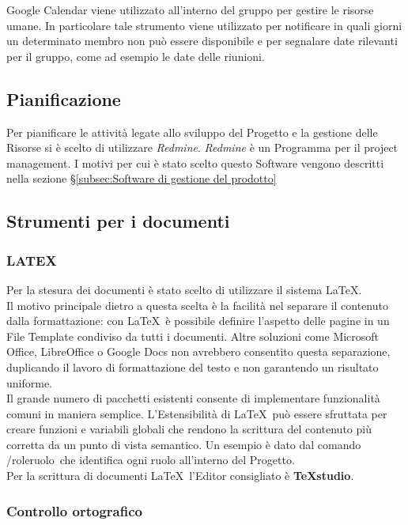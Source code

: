 Google Calendar viene utilizzato all’interno del gruppo per gestire le risorse umane. In
particolare tale strumento viene utilizzato per notificare in quali giorni un determinato
membro non può essere disponibile e per segnalare date rilevanti per il gruppo, come
ad esempio le date delle riunioni.
\subsection{Pianificazione}
\label{sec:Pianificazione}
Per pianificare le attività legate allo sviluppo del Progetto e la gestione delle Risorse si è scelto di utilizzare \emph{Redmine}.
\emph{Redmine} è un Programma per il project management. I motivi per cui è stato scelto questo Software vengono descritti nella sezione \S\ref{subsec:Software di gestione del prodotto}

\subsection{Strumenti per i documenti}
\label{sec:strumentiDocumenti}
\subsubsection{LATEX} 
 
Per la stesura dei documenti è stato scelto di utilizzare il sistema \LaTeX.\\
Il motivo principale dietro a questa scelta è la facilità nel separare il contenuto dalla formattazione: 
con \LaTeX\ è possibile definire l’aspetto delle pagine in un File Template condiviso da tutti i documenti. Altre soluzioni come Microsoft Office, LibreOffice o Google Docs non avrebbero consentito questa separazione, duplicando il lavoro di formattazione del testo e non garantendo un risultato uniforme.\\
Il grande numero di pacchetti esistenti consente di implementare funzionalità comuni in maniera semplice. L’Estensibilità di \LaTeX\ può essere sfruttata per creare funzioni e variabili globali che rendono la scrittura del contenuto più corretta da un punto di vista semantico. Un esempio è dato dal comando /role\textbraceleft ruolo\textbraceright\ che identifica ogni ruolo 
all’interno del Progetto.\\
Per la scrittura di documenti \LaTeX\  l’Editor consigliato è \textbf{TeXstudio}. 


\subsubsection{Controllo ortografico}

